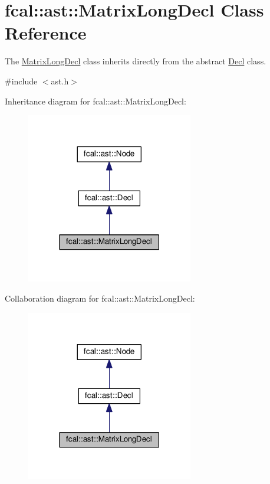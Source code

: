\hypertarget{classfcal_1_1ast_1_1MatrixLongDecl}{}\section{fcal\+:\+:ast\+:\+:Matrix\+Long\+Decl Class Reference}
\label{classfcal_1_1ast_1_1MatrixLongDecl}


The \hyperlink{classfcal_1_1ast_1_1MatrixLongDecl}{Matrix\+Long\+Decl} class inherits directly from the abstract \hyperlink{classfcal_1_1ast_1_1Decl}{Decl} class.  




{\ttfamily \#include $<$ast.\+h$>$}



Inheritance diagram for fcal\+:\+:ast\+:\+:Matrix\+Long\+Decl\+:\nopagebreak
\begin{figure}[H]
\begin{center}
\leavevmode
\includegraphics[width=206pt]{classfcal_1_1ast_1_1MatrixLongDecl__inherit__graph}
\end{center}
\end{figure}


Collaboration diagram for fcal\+:\+:ast\+:\+:Matrix\+Long\+Decl\+:\nopagebreak
\begin{figure}[H]
\begin{center}
\leavevmode
\includegraphics[width=206pt]{classfcal_1_1ast_1_1MatrixLongDecl__coll__graph}
\end{center}
\end{figure}
